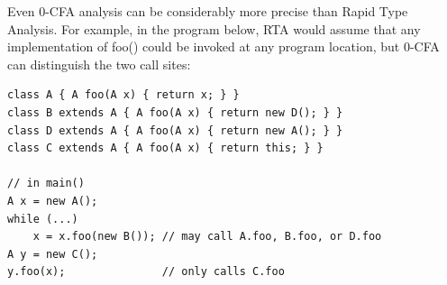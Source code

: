 \documentclass[11pt]{article}
\begin{document}
Even 0-CFA analysis can be considerably more precise than Rapid Type Analysis.
For example, in the program below, RTA would assume that any implementation of
foo() could be invoked at any program location, but 0-CFA can distinguish the
two call sites:

\begin{lstlisting}
class A { A foo(A x) { return x; } }
class B extends A { A foo(A x) { return new D(); } }
class D extends A { A foo(A x) { return new A(); } }
class C extends A { A foo(A x) { return this; } }

// in main()
A x = new A();
while (...)
    x = x.foo(new B()); // may call A.foo, B.foo, or D.foo
A y = new C();
y.foo(x);               // only calls C.foo
\end{lstlisting}
\end{document}
